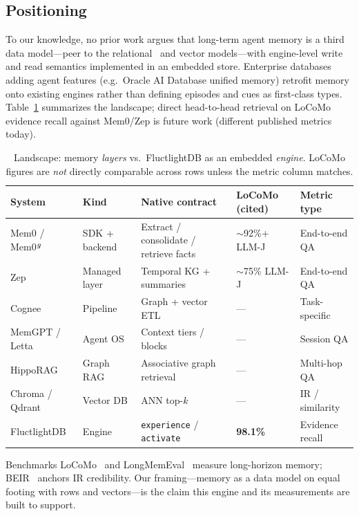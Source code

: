 \documentclass[11pt]{article}
\begin{document}
\subsection{Positioning}
To our knowledge, no prior work argues that long-term agent memory is a third data
model---peer to the relational~\cite{codd1970relational} and vector models---with
engine-level write and read semantics implemented in an embedded store. Enterprise
databases adding agent features (e.g.\ Oracle AI Database unified memory) retrofit
memory onto existing engines rather than defining episodes and cues as first-class
types. Table~\ref{tab:landscape} summarizes the landscape; direct head-to-head
retrieval on LoCoMo evidence recall against Mem0/Zep is future work (different
published metrics today).

\begin{table}[h]
\centering
\caption{Landscape: memory \emph{layers} vs.\ FluctlightDB as an embedded \emph{engine}. LoCoMo figures are \emph{not} directly comparable across rows unless the metric column matches.}
\label{tab:landscape}
\small
\begin{tabular}{p{2.0cm}p{1.6cm}p{2.4cm}p{2.6cm}p{2.2cm}}
\toprule
\textbf{System} & \textbf{Kind} & \textbf{Native contract} & \textbf{LoCoMo (cited)} & \textbf{Metric type} \\
\midrule
Mem0 / Mem0$^{\tiny g}$ & SDK + backend & Extract / consolidate / retrieve facts & $\sim$92\%+ LLM-J & End-to-end QA \\
Zep & Managed layer & Temporal KG + summaries & $\sim$75\% LLM-J & End-to-end QA \\
Cognee & Pipeline & Graph + vector ETL & --- & Task-specific \\
MemGPT / Letta & Agent OS & Context tiers / blocks & --- & Session QA \\
HippoRAG & Graph RAG & Associative graph retrieval & --- & Multi-hop QA \\
Chroma / Qdrant & Vector DB & ANN top-$k$ & --- & IR / similarity \\
FluctlightDB & Engine & \texttt{experience} / \texttt{activate} & \textbf{98.1\%} & Evidence recall \\
\bottomrule
\end{tabular}
\end{table}

Benchmarks LoCoMo~\cite{maharana2024locomo} and LongMemEval~\cite{wu2024longmemeval}
measure long-horizon memory; BEIR~\cite{thakur2021beir} anchors IR credibility.
Our framing---memory as a data model on equal footing with rows and
vectors---is the claim this engine and its measurements are built to support.
\end{document}

